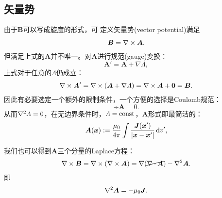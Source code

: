 \subsection{矢量势}
\label{ssec:vector potential}
由于$\bm B$可以写成旋度的形式，可
定义矢量势(vector potential)满足
\begin{equation}
    \bm B=\nabla\times\bm A.
\end{equation}
但满足上式的$\bm A$并不唯一。对$\bm A$进行规范(gauge)变换：
\[
    \bm A'=\bm A+\nabla\varLambda,
\]
上式对于任意的$\varLambda$仍成立：
\[
    \nabla\times\bm A'=\nabla\times(\bm A+\nabla\varLambda)=\nabla\times\bm A+\bm 0=\bm B.
\]
因此有必要选定一个额外的限制条件，一个方便的选择是Coulomb规范：
\begin{equation}
    \div\bm A=0.
\end{equation}
从而$\nabla^2\varLambda=0$，在无边界条件时，$\varLambda=\mathrm{const}$，$\bm A$形式即最简洁的：
\begin{equation}
    \label{eqn:A-J}
    \bm A(\bm x):=\frac{\mu_0}{4\pi}\int\frac{\bm J(\bm x')}{|\bm x-\bm x'|}\mathop{}\!\mathrm{d} v',
\end{equation}

我们也可以得到$\bm A$三个分量的Laplace方程：
\[
    \nabla\times\bm B=\nabla\times(\nabla\times\bm A)=\nabla(\cancel{\nabla\cdot\bm A})-\nabla^2\bm A.
\]
即
\begin{equation}
    \nabla^2\bm A=-\mu_0\bm J.
\end{equation}
\clearpage
